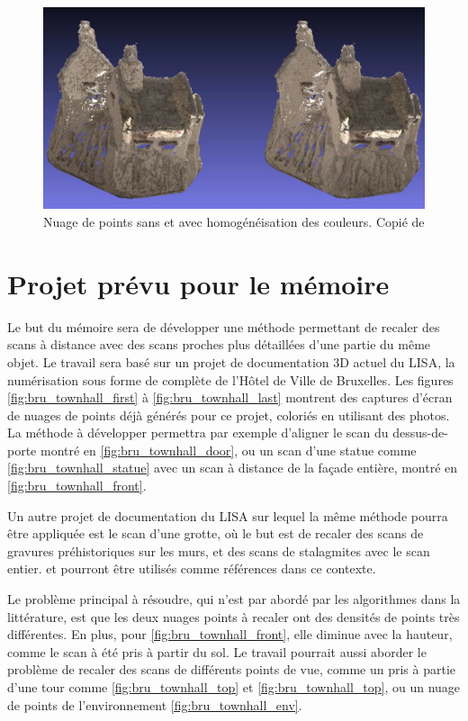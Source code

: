 \documentclass[a4paper,10pt]{scrreprt}
\begin{document}
\begin{figure}[p]
\center
\includegraphics[width=.8\textwidth]{color_correction.png}
\caption{Nuage de points sans et avec homogénéisation des couleurs. Copié de \cite{Giro2013}}
\label{fig:color_correction}
\end{figure}







\chapter{Projet prévu pour le mémoire}
Le but du mémoire sera de développer une méthode permettant de recaler des scans à distance avec des scans proches plus détaillées d'une partie du même objet. Le travail sera basé sur un projet de documentation 3D actuel du LISA, la numérisation sous forme de complète de l'Hôtel de Ville de Bruxelles. Les figures \ref{fig:bru_townhall_first} à \ref{fig:bru_townhall_last} montrent des captures d'écran de nuages de points déjà générés pour ce projet, coloriés en utilisant des photos. La méthode à développer permettra par exemple d'aligner le scan du dessus-de-porte montré en \ref{fig:bru_townhall_door}, ou un scan d'une statue comme \ref{fig:bru_townhall_statue} avec un scan à distance de la façade entière, montré en \ref{fig:bru_townhall_front}.

Un autre projet de documentation du LISA sur lequel la même méthode pourra être appliquée est le scan d'une grotte, où le but est de recaler des scans de gravures préhistoriques sur les murs, et des scans de stalagmites avec le scan entier. \cite{Kein2011} et \cite{Grus2012} pourront être utilisés comme références dans ce contexte.

Le problème principal à résoudre, qui n'est par abordé par les algorithmes dans la littérature, est que les deux nuages points à recaler ont des densités de points très différentes. En plus, pour \ref{fig:bru_townhall_front}, elle diminue avec la hauteur, comme le scan à été pris à partir du sol. Le travail pourrait aussi aborder le problème de recaler des scans de différents points de vue, comme un pris à partie d'une tour comme \ref{fig:bru_townhall_top} et \ref{fig:bru_townhall_top}, ou un nuage de points de l'environnement \ref{fig:bru_townhall_env}.
\end{document}
